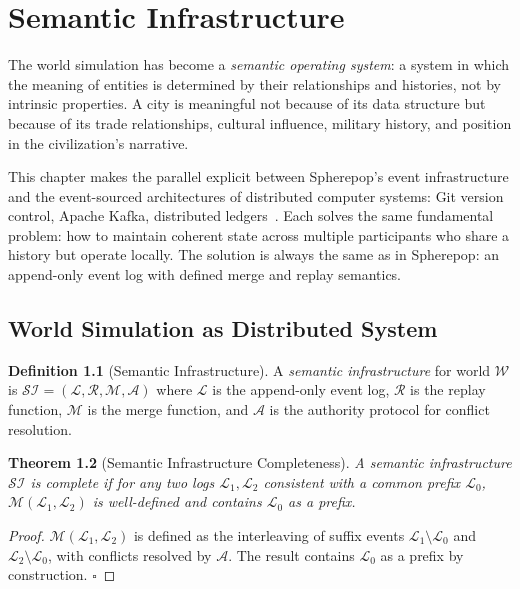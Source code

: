 \documentclass[11pt,a4paper,openany]{book}
\theoremstyle{plain}
\newtheorem{theorem}{Theorem}[chapter]
\theoremstyle{definition}
\newtheorem{definition}[theorem]{Definition}
\theoremstyle{remark}
\newenvironment{background}{%
  \begin{mdframed}[
    linecolor=sphereblue!40, backgroundcolor=sphereblue!5,
    linewidth=1pt, innertopmargin=8pt, innerbottommargin=8pt,
    innerleftmargin=10pt, innerrightmargin=10pt,
    skipabove=10pt, skipbelow=6pt
  ]%
  \setlength{\parindent}{0pt}%
  \noindent{\textcolor{sphereblue}{\textbf{Background}}}\par\smallskip\ignorespaces
}{\end{mdframed}}
\newcommand{\world}{\ensuremath{\mathcal{W}}}
\begin{document}
\chapter{Semantic Infrastructure}
\label{ch:semantic}

\begin{background}
  The world simulation has become a \emph{semantic operating system}:
  a system in which the meaning of entities is determined by their
  relationships and histories, not by intrinsic properties. A city is
  meaningful not because of its data structure but because of its trade
  relationships, cultural influence, military history, and position in
  the civilization's narrative.

  This chapter makes the parallel explicit between Spherepop's event
  infrastructure and the event-sourced architectures of distributed
  computer systems: Git version control, Apache Kafka, distributed
  ledgers~\cite{Meijer,MeijerDuality}. Each solves the same fundamental
  problem: how to maintain coherent state across multiple participants
  who share a history but operate locally. The solution is always the
  same as in Spherepop: an append-only event log with defined merge and
  replay semantics.
\end{background}

\section{World Simulation as Distributed System}

\begin{definition}[Semantic Infrastructure]
  A \emph{semantic infrastructure} for world $\world$ is
  $\mathcal{SI} = (\mathcal{L}, \mathcal{R}, \mathcal{M}, \mathcal{A})$
  where $\mathcal{L}$ is the append-only event log, $\mathcal{R}$ is
  the replay function, $\mathcal{M}$ is the merge function, and
  $\mathcal{A}$ is the authority protocol for conflict resolution.
\end{definition}

\begin{theorem}[Semantic Infrastructure Completeness]
  A semantic infrastructure $\mathcal{SI}$ is \emph{complete} if for
  any two logs $\mathcal{L}_1, \mathcal{L}_2$ consistent with a common
  prefix $\mathcal{L}_0$, $\mathcal{M}(\mathcal{L}_1, \mathcal{L}_2)$
  is well-defined and contains $\mathcal{L}_0$ as a prefix.
\end{theorem}
\begin{proof}
  $\mathcal{M}(\mathcal{L}_1, \mathcal{L}_2)$ is defined as the
  interleaving of suffix events $\mathcal{L}_1 \setminus \mathcal{L}_0$
  and $\mathcal{L}_2 \setminus \mathcal{L}_0$, with conflicts resolved
  by $\mathcal{A}$. The result contains $\mathcal{L}_0$ as a prefix
  by construction. $\square$
\end{proof}
\end{document}
